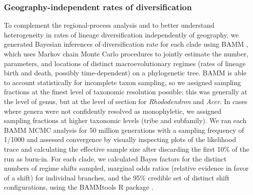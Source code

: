 \subsubsection*{Geography-independent rates of diversification}

To complement the regional-process analysis and to better understand heterogeneity in rates of lineage diversification independently of geography, we generated Bayesian inferences of diversification rate for each clade using BAMM \citep{Rabosky2014}, which uses Markov chain Monte Carlo procedures to jointly estimate the number, parameters, and locations of distinct macroevolutionary regimes (rates of lineage birth and death, possibly time-dependent) on a phylogenetic tree. BAMM is able to account statistically for incomplete taxon sampling, so we assigned sampling fractions at the finest level of taxonomic resolution possible: this was generally at the level of genus, but at the level of section for \textit{Rhododendron} and \textit{Acer}. In cases where genera were not confidently resolved as monophyletic, we assigned sampling fractions at higher taxonomic levels (tribe and subfamily). We ran each BAMM MCMC analysis for 50 million generations with a sampling frequency of 1/1000 and assessed convergence by visually inspecting plots of the likelihood trace and calculating the effective sample size after discarding the first 10\% of the run as burn-in. For each clade, we calculated Bayes factors for the distinct numbers of regime shifts sampled, marginal odds ratios (relative evidence in favor of a shift) for individual branches, and the 95\% credible set of distinct shift configurations, using the BAMMtools R package \citep{Rabosky2014}.

